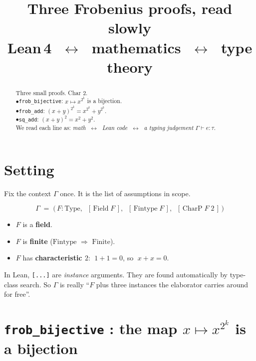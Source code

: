\documentclass[11pt]{article}
\title{\textbf{Three Frobenius proofs, read slowly}\\[4pt]
\large Lean\,4 $\;\longleftrightarrow\;$ mathematics $\;\longleftrightarrow\;$ type theory}
\author{}
\date{}
\newcommand{\note}[1]{%
  \par\smallskip
  \noindent\colorbox{leanbg}{\parbox{\dimexpr\linewidth-2\fboxsep}{\small #1}}%
  \par\smallskip}
\begin{document}
\maketitle

\begin{abstract}
\noindent
Three small proofs. Char $2$.\\[2pt]
$\bullet$\quad \texttt{frob\_bijective}: $x \mapsto x^{2^k}$ is a bijection.\\[2pt]
$\bullet$\quad \texttt{frob\_add}: $(x+y)^{2^k} = x^{2^k}+y^{2^k}$.\\[2pt]
$\bullet$\quad \texttt{sq\_add}: $(x+y)^2 = x^2+y^2$.\\[6pt]
\noindent
We read each line as: \emph{math} $\;\leftrightarrow\;$ \emph{Lean code} $\;\leftrightarrow\;$ \emph{a typing judgement} $\Gamma \vdash e : \tau$.
\end{abstract}

\bigskip

\section*{Setting}

\noindent
Fix the context $\Gamma$ once. It is the list of assumptions in scope.

\[
\Gamma \;=\;
\bigl(\, F : \mathrm{Type},\;\;
[\,\mathrm{Field}\;F\,],\;\;
[\,\mathrm{Fintype}\;F\,],\;\;
[\,\mathrm{CharP}\;F\;2\,] \,\bigr)
\]

\begin{itemize}\itemsep4pt
  \item $F$ is a \textbf{field}.
  \item $F$ is \textbf{finite} ($\mathrm{Fintype}$ $\Rightarrow$ $\mathrm{Finite}$).
  \item $F$ has \textbf{characteristic $2$}: $\;1+1 = 0$, so $\;x + x = 0$.
\end{itemize}

\note{In Lean, \texttt{[...]} are \emph{instance} arguments. They are found
automatically by type-class search. So $\Gamma$ is really
``$F$ plus three instances the elaborator carries around for free''.}

\bigskip

\section{\texttt{frob\_bijective} : the map $x \mapsto x^{2^k}$ is a bijection}
\end{document}
